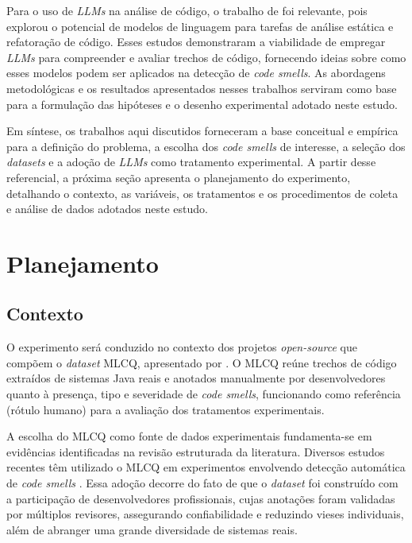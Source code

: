 Para o uso de \textit{LLMs} na análise de código, o trabalho de \cite{Abtahi2025LLMStaticAnalysis, Tkachuk2025RefactoringGAI} foi  
relevante, pois explorou o potencial de modelos de linguagem para tarefas de análise estática e refatoração de código. 
Esses estudos demonstraram a viabilidade de empregar \textit{LLMs} para compreender e avaliar trechos de código, fornecendo 
ideias sobre como esses modelos podem ser aplicados na detecção de \textit{code smells}. As abordagens metodológicas 
e os resultados apresentados nesses trabalhos serviram como base para a formulação das hipóteses e o desenho experimental 
adotado neste estudo.

Em síntese, os trabalhos aqui discutidos forneceram a base conceitual e empírica para a definição do problema, a escolha dos
\textit{code smells} de interesse, a seleção dos \textit{datasets} e a adoção de \textit{LLMs} como tratamento experimental. A partir desse
referencial, a próxima seção apresenta o planejamento do experimento, detalhando o contexto, as variáveis, os tratamentos
e os procedimentos de coleta e análise de dados adotados neste estudo.



\section{Planejamento}

\subsection{Contexto}

O experimento será conduzido no contexto dos projetos \textit{open-source} que compõem o
\textit{dataset} MLCQ, apresentado por . O MLCQ reúne trechos de código
extraídos de sistemas Java reais e anotados manualmente por desenvolvedores quanto à presença,
tipo e severidade de \textit{code smells}, funcionando como referência (rótulo humano) para a
avaliação dos tratamentos experimentais.

A escolha do MLCQ como fonte de dados experimentais fundamenta-se em evidências 
identificadas na revisão estruturada da literatura. Diversos estudos recentes têm utilizado o 
MLCQ em experimentos envolvendo detecção automática de \textit{code smells} 
\cite{Kovacevic2022AutomaticDetection,Ho2025EnseSmells,Sandouka2025CrossLanguage}. 
Essa adoção decorre do fato de que o \textit{dataset} foi construído com a participação de desenvolvedores profissionais, 
cujas anotações foram validadas por múltiplos revisores, assegurando confiabilidade e reduzindo vieses individuais, 
além de abranger uma grande diversidade de sistemas reais.

